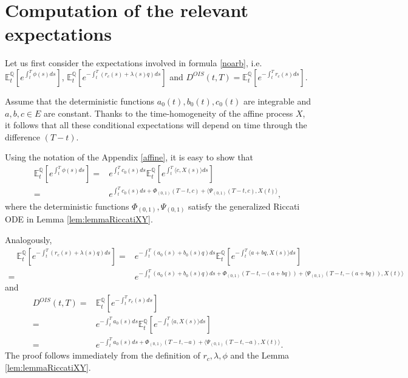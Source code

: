 \documentclass[12pt,a4paper]{article}
\theoremstyle{plain}
\numberwithin{equation}{section}
\begin{document}
\section{Computation of the relevant expectations}\label{expectations}


Let us first consider the expectations involved in formula \eqref{noarb}, i.e. $\mathbb{E}_t^\mathbb{Q}\left[e^{\int_{t}^T\phi(s)ds}\right]$, $\mathbb{E}_t^\mathbb{Q}\left[e^{-\int_{t}^T(r_c(s)+\lambda(s)q)ds}\right] $ and $D^{OIS}(t,T)=\mathbb{E}_t^\mathbb{Q}\left[e^{-\int_t^Tr_c(s)ds}\right].
$

 Assume that the deterministic functions $a_0(t), b_0(t), c_0(t)$ are integrable and $a,b,c\in E$ are constant. Thanks to the time-homogeneity of the affine  process $X$, it follows that all these conditional expectations will depend on time through the difference $(T-t)$.


Using the notation of the Appendix \ref{affine}, it is easy to show that
\begin{align}
\mathbb{E}_t^\mathbb{Q}\left[e^{\int_{t}^T\phi(s)ds}\right]=&
e^{\int_t^Tc_0(s)ds}\mathbb{E}_t^\mathbb{Q}\left[e^{\int_t^T\langle c, X(s)\rangle ds}\right]\nonumber\\
=&e^{\int_t^Tc_0(s)ds+\Phi_{(0,1)}(T-t,c)+\langle \Psi_{(0,1)}(T-t,c),X(t)\rangle },\label{transformphi}
\end{align}
where the deterministic functions $\Phi_{(0,1)}, \Psi_{(0,1)}$ satisfy the generalized Riccati ODE in Lemma \ref{lem:lemmaRiccatiXY}.

Analogously,
\begin{align}
\quad \mathbb{E}_t^\mathbb{Q}\left[e^{-\int_{t}^T(r_c(s)+\lambda(s)q)ds}\right]=&
e^{-\int_t^T(a_0(s)+b_0(s)q)ds}\mathbb{E}_t^\mathbb{Q}\left[e^{-\int_t^T\langle a+bq, X(s)\rangle ds}\right]\nonumber\\
=&e^{-\int_t^T(a_0(s)+b_0(s)q)ds+\Phi_{(0,1)}(T-t,-(a+bq))+\langle \Psi_{(0,1)}(T-t,-(a+bq)),X(t)\rangle }\label{transformrclambda}
\end{align}
and
\begin{align}
D^{OIS}(t,T)=& \mathbb{E}_t^\mathbb{Q}\left[e^{-\int_{t}^Tr_c(s)ds}\right]\nonumber\\
=&
e^{-\int_t^Ta_0(s)ds}\mathbb{E}_t^\mathbb{Q}\left[e^{-\int_t^T\langle a, X(s)\rangle ds}\right]\nonumber\\
=&e^{-\int_t^Ta_0(s)ds+\Phi_{(0,1)}(T-t,-a)+\langle \Psi_{(0,1)}(T-t,-a),X(t)\rangle }.\label{OISbondprice}
\end{align}
The proof follows immediately from the definition of $r_c,\lambda,\phi$ and the Lemma \ref{lem:lemmaRiccatiXY}.
\end{document}
